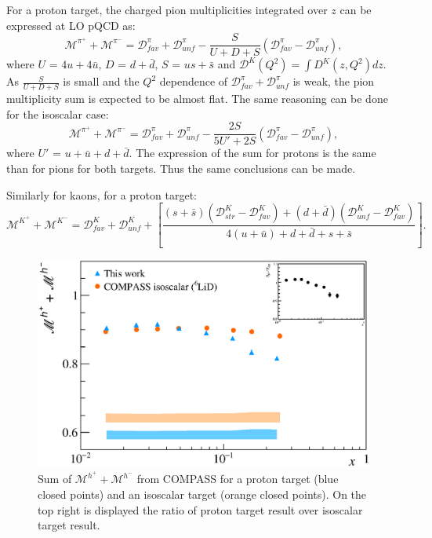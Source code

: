 For a proton target, the charged pion multiplicities integrated over $z$ can be expressed at LO pQCD as:
%
\begin{equation}\label{eq:pisum}
  \mathscr{M}^{\pi^+}+\mathscr{M}^{\pi^-} = \mathscr{D}^{\pi}_{fav} + \mathscr{D}^{\pi}_{unf} - \frac{S}{U+D+S} \left( \mathscr{D}^{\pi}_{fav} - \mathscr{D}^{\pi}_{unf} \right),
\end{equation}
%
where $U$ = $4u+4\bar{u}$, $D$ = $d+\bar{d}$, $S$ = $us+\bar{s}$ and $\mathscr{D}^K(Q^2) = \int D^K(z,Q^2) dz $. As $\frac{S}{U+D+S}$ is small and the $Q^2$ dependence of $\mathscr{D}^{\pi}_{fav} + \mathscr{D}^{\pi}_{unf}$ is weak, the pion multiplicity sum is expected to be almost flat. The same reasoning can be done for the isoscalar case:
%
\begin{equation}
  \mathscr{M}^{\pi^+}+\mathscr{M}^{\pi^-} = \mathscr{D}^{\pi}_{fav} + \mathscr{D}^{\pi}_{unf} - \frac{2S}{5U'+2S} \left( \mathscr{D}^{\pi}_{fav} - \mathscr{D}^{\pi}_{unf} \right),
\end{equation}
%
where $U'$ = $u+\bar{u}+d+\bar{d}$. The expression of the sum for protons is the same than for pions for both targets. Thus the same conclusions can be made.

Similarly for kaons, for a proton target:
%
\begin{equation}
  \mathscr{M}^{K^+}+\mathscr{M}^{K^-} = \mathscr{D}^K_{fav}+\mathscr{D}^K_{unf}+\left[\frac{(s+\bar{s})\left( \mathscr{D}^K_{str}-\mathscr{D}^K_{fav} \right) + (d+\bar{d})\left( \mathscr{D}^K_{unf}-\mathscr{D}^K_{fav} \right)}{4(u+\bar{u}) + d + \bar{d} + s + \bar{s}} \right].
\end{equation}
%
\newpage

\begin{figure}[!h]
  \centering
	\includegraphics[scale=0.5]{./gfx/Mult_h_sum.eps}
	\caption{Sum of $\mathscr{M}^{h^+}+\mathscr{M}^{h^-}$ from COMPASS for a proton target (blue closed points) and an isoscalar target (orange closed points). On the top right is displayed the ratio of proton target result over isoscalar target result.}
	\label{pic:hsum}
\end{figure}

